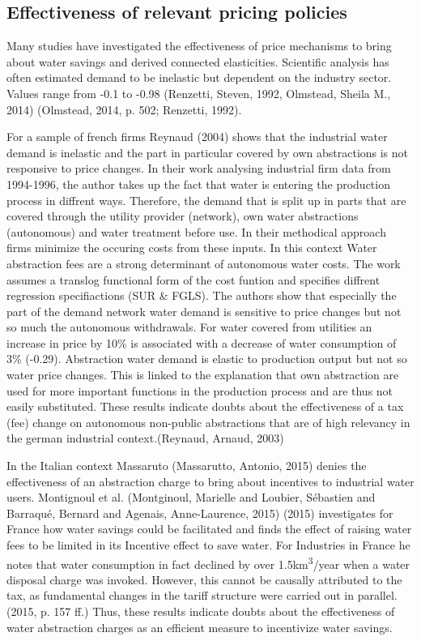 \documentclass[11pt]{article}
\begin{document}
\subsection{Effectiveness of relevant pricing policies}
\label{sec:org20109d1}
\label{sec: Effectiveness of WAF}
Many studies have investigated the effectiveness of price mechanisms to bring about water savings and derived connected elasticities. Scientific analysis has often estimated demand to be inelastic but dependent on the industry sector. Values range from -0.1 to -0.98 (Renzetti, Steven, 1992,  Olmstead, Sheila M., 2014)  (Olmstead, 2014, p. 502; Renzetti, 1992).

For a sample of french firms Reynaud (2004) shows that the industrial water demand is inelastic and the part in particular covered by own abstractions is not responsive to price changes.
In their work analysing industrial firm data from 1994-1996, the author takes up the fact that water is entering the production process in diffrent ways. Therefore, the demand that is split up in parts that are covered through the utility provider (network), own water abstractions (autonomous) and water treatment before use.
In their methodical approach firms minimize the occuring costs from these inputs. In this context Water abstraction fees are a strong determinant of autonomous water costs.  The work assumes a translog functional form of the cost funtion and specifies diffrent regression specifiactions (SUR \& FGLS).
The authors show that especially the part of the demand network water demand is sensitive to price changes but not so much the autonomous withdrawals.
For water covered from utilities an increase in price by 10\% is associated with a decrease of water consumption of 3\% (-0.29). Abstraction water demand is elastic to production output but not so water price changes.
This is linked to the explanation that own abstraction are used for more important functions in the production process and are thus not easily substituted.
These results indicate doubts about the effectiveness of a tax (fee) change on autonomous non-public abstractions that are of high relevancy in the german industrial context.(Reynaud, Arnaud, 2003)

In the Italian context Massaruto (Massarutto, Antonio, 2015) denies the effectiveness of an abstraction charge to bring about incentives to industrial water users. Montignoul et al. (Montginoul, Marielle and Loubier, Sébastien and Barraqué, Bernard and Agenais, Anne-Laurence, 2015) (2015) investigates for France how water savings could be facilitated and finds the effect of raising water fees to be limited in its Incentive effect to save water. For Industries in France he notes that water consumption in fact declined by over 1.5km\textsuperscript{3}/year when a water disposal charge was invoked. However, this cannot be causally attributed to the tax, as fundamental changes in the tariff structure were carried out in parallel.(2015, p. 157 ff.)
Thus, these results indicate doubts about the effectiveness of water abstraction charges as an efficient measure to incentivize water savings.
\end{document}
